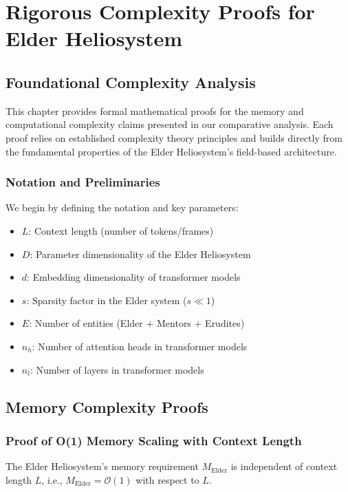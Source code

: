 \chapter{Rigorous Complexity Proofs for Elder Heliosystem}

\section{Foundational Complexity Analysis}

This chapter provides formal mathematical proofs for the memory and computational complexity claims presented in our comparative analysis. Each proof relies on established complexity theory principles and builds directly from the fundamental properties of the Elder Heliosystem's field-based architecture.

\subsection{Notation and Preliminaries}

We begin by defining the notation and key parameters:
\begin{itemize}
    \item $L$: Context length (number of tokens/frames)
    \item $D$: Parameter dimensionality of the Elder Heliosystem
    \item $d$: Embedding dimensionality of transformer models
    \item $s$: Sparsity factor in the Elder system ($s \ll 1$)
    \item $E$: Number of entities (Elder + Mentors + Erudites)
    \item $n_h$: Number of attention heads in transformer models
    \item $n_l$: Number of layers in transformer models
\end{itemize}

\section{Memory Complexity Proofs}

\subsection{Proof of O(1) Memory Scaling with Context Length}

\begin{theorem}
The Elder Heliosystem's memory requirement $M_{\text{Elder}}$ is independent of context length $L$, i.e., $M_{\text{Elder}} = \mathcal{O}(1)$ with respect to $L$.
\end{theorem}

